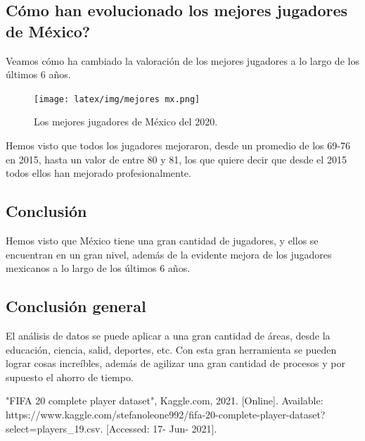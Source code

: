\documentclass[10pt]{article}
\begin{document}
\begin{center}
    \section*{\textbf{Cómo han evolucionado los mejores jugadores de México?}}
\end{center}
Veamos cómo ha cambiado la valoración de los mejores jugadores a lo largo de los últimos 6 años.

\begin{figure}[H]
    \centering
    \texttt{[image: latex/img/mejores mx.png]}
    \caption{Los mejores jugadores de México del 2020.}
    \label{fig:my_label}
\end{figure}

Hemos visto que  todos los  jugadores mejoraron, desde un promedio de los 69-76 en 2015, hasta un valor de entre 80 y 81, los  que quiere decir que desde el 2015 todos ellos han mejorado profesionalmente.  
 \begin{center}
    \section*{\textbf{Conclusión}}  
 \end{center}
 

Hemos visto que México tiene una gran cantidad de jugadores, y ellos se encuentran en un gran nivel, además de la evidente mejora de los jugadores mexicanos a lo largo de los últimos 6 años.
\subsection*{Conclusión general}

El  análisis de datos se puede aplicar a una gran cantidad de áreas, desde la educación, ciencia, salid, deportes, etc. Con esta gran herramienta se pueden lograr cosas increíbles, además de agilizar una gran cantidad de procesos y por supuesto el ahorro de tiempo.

\begin{thebibliography}{}
"FIFA 20 complete player dataset", Kaggle.com, 2021. [Online]. Available: https://www.kaggle.com/stefanoleone992/fifa-20-complete-player-dataset?select=players_19.csv. [Accessed: 17- Jun- 2021].

\end{thebibliography}
\end{document}
